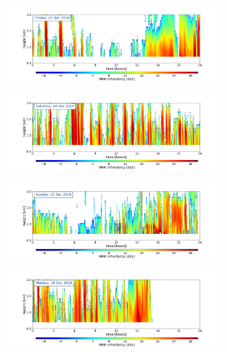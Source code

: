 \begin{figure}[H]
	\centering
	\begin{subfigure}[t]{\textwidth}
		\centering
		\includegraphics[trim={4.cm 2.5cm 4.5cm 1.5cm},clip,width=0.91\textwidth]{./fig_MRR_refl/MRR_20161223}
		\caption{}\label{fig:ret:refl23}
	\end{subfigure}
	\begin{subfigure}[t]{\textwidth}
		\centering
		\includegraphics[trim={4.cm 2.5cm 4.5cm 1.5cm},clip,width=0.91\textwidth]{./fig_MRR_refl/MRR_20161224}
		\caption{}\label{fig:ret:refl24}
	\end{subfigure}
	\begin{subfigure}[t]{\textwidth}
		\centering
		\includegraphics[trim={4.cm 2.5cm 4.5cm 1.5cm},clip,width=0.91\textwidth]{./fig_MRR_refl/MRR_20161225}
		\caption{}\label{fig:ret:refl25}
	\end{subfigure}
	\begin{subfigure}[t]{\textwidth}
		\centering
		\includegraphics[trim={4.cm 2.5cm 4.5cm 1.5cm},clip,width=0.91\textwidth]{./fig_MRR_refl/MRR_20161226}

\end{subfigure}
\end{figure}
